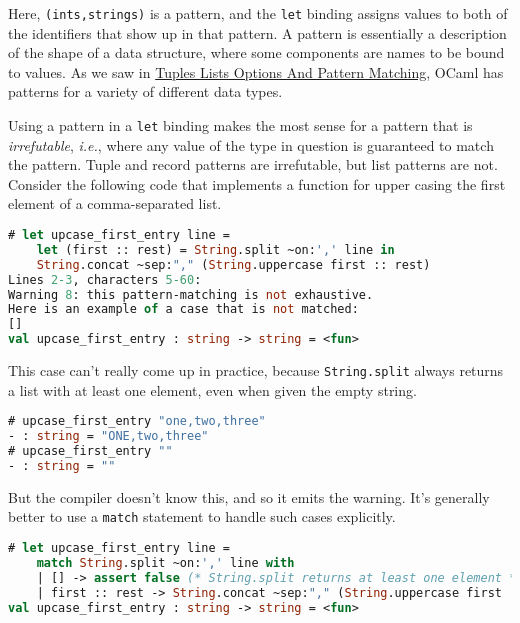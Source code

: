 Here, \passthrough{\lstinline!(ints,strings)!} is a pattern, and the
\passthrough{\lstinline!let!} binding assigns values to both of the
identifiers that show up in that pattern. A pattern is essentially a
description of the shape of a data structure, where some components are
names to be bound to values. As we saw in
\href{guided-tour.html\#tuples-lists-options-and-pattern-matching}{Tuples
Lists Options And Pattern Matching}, OCaml has patterns for a variety of
different data types.

Using a pattern in a \passthrough{\lstinline!let!} binding makes the
most sense for a pattern that is \emph{irrefutable}, \emph{i.e.}, where
any value of the type in question is guaranteed to match the pattern.
Tuple and record patterns are irrefutable, but list patterns are not.
Consider the following code that implements a function for upper casing
the first element of a comma-separated list.

\begin{lstlisting}[language=Caml]
# let upcase_first_entry line =
    let (first :: rest) = String.split ~on:',' line in
    String.concat ~sep:"," (String.uppercase first :: rest)
Lines 2-3, characters 5-60:
Warning 8: this pattern-matching is not exhaustive.
Here is an example of a case that is not matched:
[]
val upcase_first_entry : string -> string = <fun>
\end{lstlisting}

This case can't really come up in practice, because
\passthrough{\lstinline!String.split!} always returns a list with at
least one element, even when given the empty string.

\begin{lstlisting}[language=Caml]
# upcase_first_entry "one,two,three"
- : string = "ONE,two,three"
# upcase_first_entry ""
- : string = ""
\end{lstlisting}

But the compiler doesn't know this, and so it emits the warning. It's
generally better to use a \passthrough{\lstinline!match!} statement to
handle such cases explicitly.

\begin{lstlisting}[language=Caml]
# let upcase_first_entry line =
    match String.split ~on:',' line with
    | [] -> assert false (* String.split returns at least one element *)
    | first :: rest -> String.concat ~sep:"," (String.uppercase first :: rest)
val upcase_first_entry : string -> string = <fun>
\end{lstlisting}

